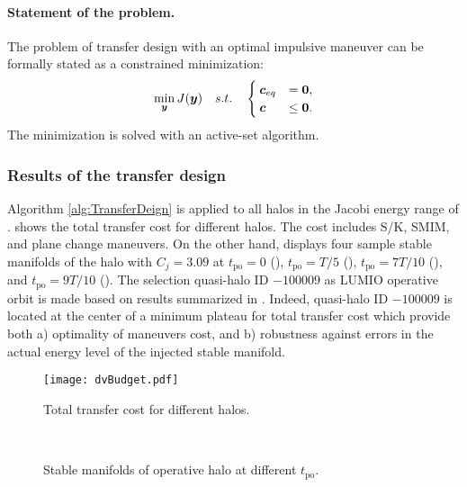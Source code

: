 \paragraph{Statement of the problem.}
	The problem of transfer design with an optimal impulsive maneuver can be formally stated as a constrained minimization:
	\begin{align}\label{pb:minimizaionTransferDesign}
	\min_{\boldsymbol{y}}{J(\boldsymbol{y})}\quad s.t. \quad
	\begin{cases}
	\boldsymbol{c}_{eq} &= \boldsymbol{0}, \\
	\boldsymbol{c} &\le \boldsymbol{0}.
	\end{cases}
	\end{align}
The minimization is solved with an active-set algorithm.


\subsubsection{Results of the transfer design }\label{subsubsec:TransferDesignResults}
Algorithm \ref{alg:TransferDeign} is applied to all halos in the Jacobi energy range of .  shows the total transfer cost for different halos. The cost includes S/K, SMIM, and plane change maneuvers. On the other hand,  displays four sample stable manifolds of the halo with $C_j = 3.09$ at $t_{\textrm{po}}=0$ (), $t_{\textrm{po}}=T/5$ (), $t_{\textrm{po}}=7T/10$ (), and $t_{\textrm{po}}=9T/10$ (). The selection quasi-halo ID $-100009$ as LUMIO operative orbit is made based on results summarized in . Indeed, quasi-halo ID $-100009$ is located at the center of a minimum plateau for total transfer cost which provide both a) optimality of maneuvers cost, and b) robustness against errors in the actual energy level of the injected stable manifold.
%
\begin{figure*}[t!]
	\centering
	\texttt{[image: dvBudget.pdf]}
	\caption{Total transfer cost for different halos.}
	\label{fig:TotalTransferCost}
\end{figure*}
%
%
\begin{figure}[t]
	\centering
	\hfill
	\hfill
	 \\
	\hfill
	\hfill
	\hfill
	\caption{Stable manifolds of operative halo at different $t_{\textrm{po}}$.}
	\label{fig:Halo9SampleStableManifold}
\end{figure}
%

